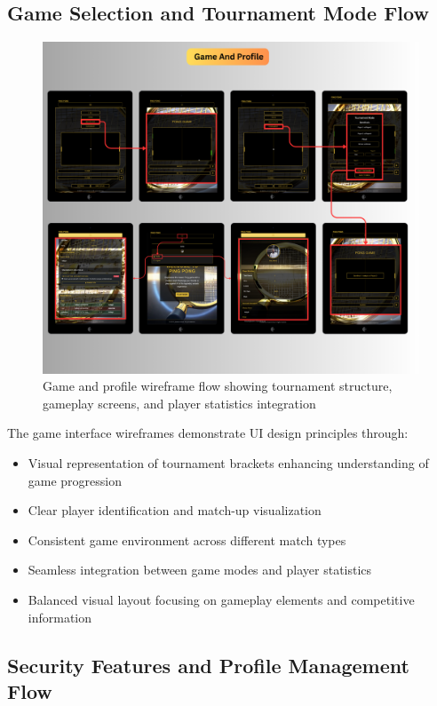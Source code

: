 \subsection{Game Selection and Tournament Mode Flow}

\begin{figure}[H]
    \centering
    \includegraphics[width=0.9\linewidth]{Figures/images/wireframes/3.png}
    \caption{Game and profile wireframe flow showing tournament structure, gameplay screens, and player statistics integration}
    \label{fig:wireframe-game-tournament}
\end{figure}

The game interface wireframes demonstrate UI design principles through:
\begin{itemize}
    \item Visual representation of tournament brackets enhancing understanding of game progression
    \item Clear player identification and match-up visualization
    \item Consistent game environment across different match types
    \item Seamless integration between game modes and player statistics
    \item Balanced visual layout focusing on gameplay elements and competitive information
\end{itemize}

\subsection{Security Features and Profile Management Flow}

